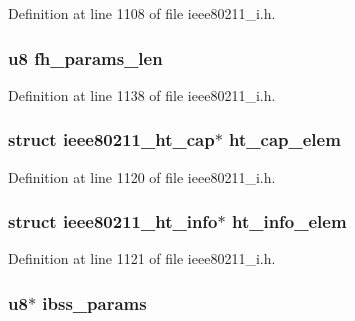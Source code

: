 Definition at line 1108 of file ieee80211\-\_\-i.\-h.

\hypertarget{structieee802__11__elems_a322eb9d3c396e5829bb88e7964252d35}{
\subsubsection[{fh\-\_\-params\-\_\-len}]{\setlength{\rightskip}{0pt plus 5cm}u8 fh\-\_\-params\-\_\-len}}\label{structieee802__11__elems_a322eb9d3c396e5829bb88e7964252d35}


Definition at line 1138 of file ieee80211\-\_\-i.\-h.

\hypertarget{structieee802__11__elems_ac24d4796157d7ad3003b848a7ce3c118}{
\subsubsection[{ht\-\_\-cap\-\_\-elem}]{\setlength{\rightskip}{0pt plus 5cm}struct ieee80211\-\_\-ht\-\_\-cap$\ast$ ht\-\_\-cap\-\_\-elem}}\label{structieee802__11__elems_ac24d4796157d7ad3003b848a7ce3c118}


Definition at line 1120 of file ieee80211\-\_\-i.\-h.

\hypertarget{structieee802__11__elems_a997ee83c8c6d2c120512c69b41bbfff1}{
\subsubsection[{ht\-\_\-info\-\_\-elem}]{\setlength{\rightskip}{0pt plus 5cm}struct ieee80211\-\_\-ht\-\_\-info$\ast$ ht\-\_\-info\-\_\-elem}}\label{structieee802__11__elems_a997ee83c8c6d2c120512c69b41bbfff1}


Definition at line 1121 of file ieee80211\-\_\-i.\-h.

\hypertarget{structieee802__11__elems_a7fac4f71f2df266e10c20cca69544c9b}{
\subsubsection[{ibss\-\_\-params}]{\setlength{\rightskip}{0pt plus 5cm}u8$\ast$ ibss\-\_\-params}}\label{structieee802__11__elems_a7fac4f71f2df266e10c20cca69544c9b}


